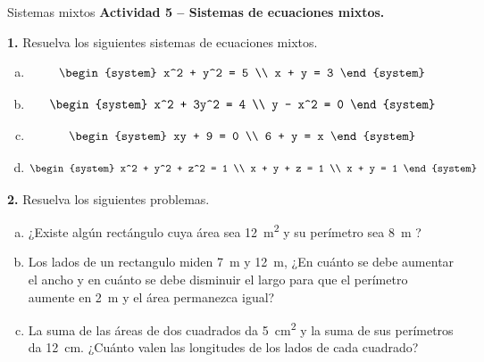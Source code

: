 \documentclass[9pt, aspectratio=169]{beamer}
\begin{document}
\begin{frame}{Sistemas mixtos}
    \textbf{Actividad 5 -- Sistemas de ecuaciones mixtos.}

\textbf{1.} Resuelva los siguientes sistemas de ecuaciones mixtos. 
\begin{multicols}{4}
    \begin{enumerate}[a)]
        \item \[ \begin{system} x^2 + y^2 = 5 \\ x + y = 3 \end{system} \] 
        \item \[ \begin{system} x^2 + 3y^2 = 4 \\ y - x^2 = 0 \end{system} \]
        \item \[ \begin{system} xy + 9 = 0 \\ 6 + y = x \end{system} \]
        \item  \[ \begin{system} x^2 + y^2 + z^2 = 1 \\ x + y + z = 1 \\ x + y = 1 \end{system} \]
    \end{enumerate}
\end{multicols}

\textbf{2.} Resuelva los siguientes problemas. 
    \begin{enumerate}[a)]
\item ¿Existe algún rectángulo cuya área sea \qty{12}{m^2} y su perímetro sea \qty{8}{m} ?
        \item Los lados de un rectangulo miden \qty{7}{m} y \qty{12}{m}, ¿En cuánto se debe aumentar el ancho y en cuánto se debe disminuir el largo para que el perímetro aumente en \qty{2}{m} y el área permanezca igual?
        \item La suma de las áreas de dos cuadrados da \qty{5}{cm^2} y la suma de sus perímetros da \qty{12}{cm}. ¿Cuánto valen las longitudes de los lados de cada cuadrado?
    \end{enumerate}
\end{frame}
\end{document}
